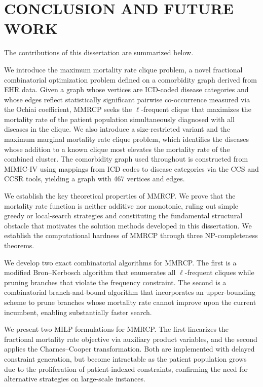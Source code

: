 \begingroup
\clearpage
\let\clearpage\relax
\vspace*{-16pt}
\chapter[CONCLUSION AND FUTURE WORK]{CONCLUSION AND FUTURE WORK}\label{sec.conclusion}
\endgroup
The contributions of this dissertation are summarized below.

We introduce the maximum mortality rate clique problem, a
novel fractional combinatorial optimization problem defined on a
comorbidity graph derived from EHR data. Given a graph whose vertices
are ICD-coded disease categories and whose edges reflect statistically
significant pairwise co-occurrence measured via the Ochiai
coefficient, MMRCP seeks the $\ell$-frequent clique that maximizes
the mortality rate of the patient population simultaneously diagnosed
with all diseases in the clique. We also introduce a size-restricted
variant and the maximum marginal mortality rate clique problem, which
identifies the diseases whose addition to a known clique most elevates
the mortality rate of the combined cluster. The comorbidity graph used
throughout is constructed from MIMIC-IV using mappings from ICD codes
to disease categories via the CCS and CCSR tools, yielding a graph with
467 vertices and  edges.

We establish the key theoretical properties of MMRCP. We prove that
the mortality rate function is neither additive nor monotonic, ruling
out simple greedy or local-search strategies and constituting the
fundamental structural obstacle that motivates the solution methods
developed in this dissertation. We establish the computational
hardness of MMRCP through three NP-completeness theorems.

We develop two exact combinatorial algorithms for MMRCP. The first is
a modified Bron--Kerbosch algorithm that enumerates all
$\ell$-frequent cliques while pruning branches that violate the
frequency constraint. The second is a combinatorial branch-and-bound
algorithm that incorporates an upper-bounding scheme to prune
branches whose mortality rate cannot improve upon the current
incumbent, enabling substantially faster search.

We present two MILP formulations for MMRCP. The first linearizes the
fractional mortality rate objective via auxiliary product variables,
and the second applies the Charnes--Cooper transformation. Both are
implemented with delayed constraint generation, but become
intractable as the patient population grows due to the proliferation
of patient-indexed constraints, confirming the need for alternative
strategies on large-scale instances.

